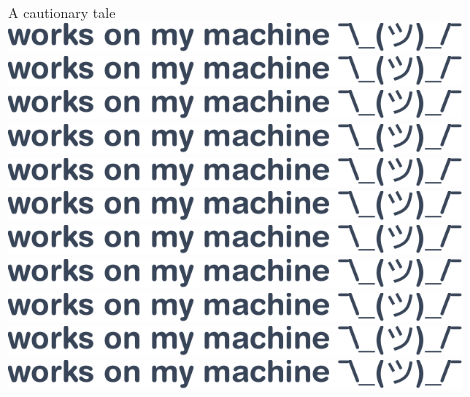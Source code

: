 \documentclass[a4paper]{beamer}
\begin{document}
\begin{frame}{A cautionary tale}
     {
    }
     {
        \includegraphics[width=0.9\textwidth]{img/works-on-my-machine.pdf}
    }
     {
        \includegraphics[width=0.9\textwidth]{img/works-on-my-machine.pdf}
    }
     {
        \includegraphics[width=0.9\textwidth]{img/works-on-my-machine.pdf}
    }
     {
        \includegraphics[width=0.9\textwidth]{img/works-on-my-machine.pdf}
    }
     {
        \includegraphics[width=0.9\textwidth]{img/works-on-my-machine.pdf}
    }
     {
        \includegraphics[width=0.9\textwidth]{img/works-on-my-machine.pdf}
    }
     {
        \includegraphics[width=0.9\textwidth]{img/works-on-my-machine.pdf}
    }
     {
        \includegraphics[width=0.9\textwidth]{img/works-on-my-machine.pdf}
    }
     {
        \includegraphics[width=0.9\textwidth]{img/works-on-my-machine.pdf}
    }
     {
        \includegraphics[width=0.9\textwidth]{img/works-on-my-machine.pdf}
    }
     {
        \includegraphics[width=0.9\textwidth]{img/works-on-my-machine.pdf}
    }
\end{frame}
\end{document}
